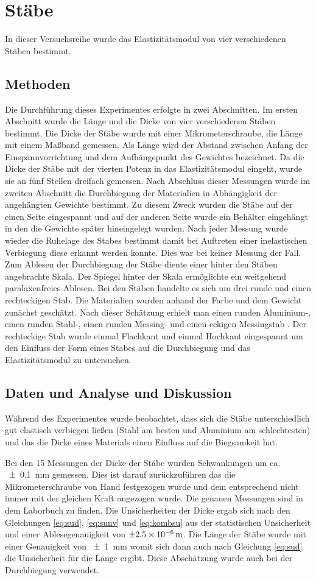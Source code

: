 \section{Stäbe}
In dieser Versuchsreihe wurde das Elastizitätsmodul von vier verschiedenen Stäben bestimmt.
\subsection{Methoden}
Die Durchführung dieses Experimentes erfolgte in zwei Abschnitten.
Im ersten Abschnitt wurde die Länge und die Dicke von vier verschiedenen Stäben bestimmt.
Die Dicke der Stäbe wurde mit einer Mikrometerschraube, die Länge  mit einem Maßband gemessen. Als Länge wird der Abstand zwischen Anfang der Einspannvorrichtung   und dem Aufhängepunkt des Gewichtes bezeichnet.
Da die Dicke der Stäbe mit der vierten Potenz in das Elastizitätsmodul eingeht, wurde sie an fünf Stellen dreifach gemessen.  Nach Abschluss dieser Messungen wurde im zweiten Abschnitt die Durchbiegung der Materialien in Abhängigkeit der angehängten Gewichte bestimmt. Zu diesem Zweck wurden die Stäbe auf der einen Seite eingespannt und auf der anderen Seite wurde ein Behälter eingehängt in den die Gewichte später hineingelegt wurden.
Nach jeder Messung wurde wieder die Ruhelage des Stabes bestimmt damit bei Auftreten einer inelastischen Verbiegung diese erkannt werden konnte. Dies war bei keiner Messung der Fall. Zum Ablesen der Durchbiegung der Stäbe diente einer hinter den Stäben angebrachte Skala. Der Spiegel hinter der Skala ermöglichte ein weitgehend paralaxenfreies Ablesen.
Bei den Stäben handelte es sich um drei runde und einen rechteckigen Stab. Die Materialien wurden anhand der Farbe und dem Gewicht zunächst geschätzt.
Nach dieser Schätzung erhielt man einen runden Aluminium-, einen runden Stahl-, einen runden Messing- und einen eckigen Messingstab . Der rechteckige Stab wurde einmal Flachkant und einmal Hochkant eingespannt um den Einfluss der Form eines Stabes auf die Durchbiegung und das Elastizitätsmodul zu untersuchen.

\subsection{Daten und Analyse und Diskussion}
Während des Experimentes wurde beobachtet, dass sich die Stäbe unterschiedlich gut elastisch verbiegen ließen (Stahl am besten und Aluminium am schlechtesten) und das die Dicke eines Materials 
einen Einfluss auf die Biegsamkeit hat.

Bei  den 15 Messungen der Dicke der Stäbe wurden Schwankungen um ca. \SI{+-0,1}{mm} gemessen. Dies ist darauf zurückzuführen das die Mikrometerschraube von Hand festgezogen wurde und dem entsprechend nicht immer mit der gleichen Kraft angezogen wurde.
Die genauen Messungen sind in dem Laborbuch zu finden. Die Unsicherheiten der Dicke ergab sich nach den Gleichungen \ref{eq:sud}, \ref{eq:sunv} und \ref{eq:kombsu} aus der statistischen Unsicherheit und einer Ablesegenauigkeit von $\SI{\pm 2.5e-6}{m}$.   
Die Länge der Stäbe wurde mit einer Genauigkeit von \SI{+-1}{mm} womit sich dann auch nach Gleichung \ref{eq:sud} die Unsicherheit für die Länge ergibt. Diese Abschätzung wurde auch bei der Durchbiegung verwendet.

